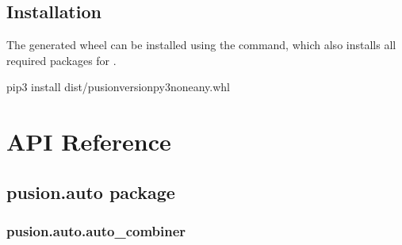 \documentclass[letterpaper,10pt,english]{sphinxmanual}
\begin{document}
\section{Installation}
\label{\detokenize{install:installation}}
\sphinxAtStartPar
The generated wheel can be installed using the  command, which also installs all required packages for .

\begin{sphinxVerbatim}[commandchars=\\\{\}]
pip3 install dist/pusion\PYGZhy{}\PYGZlt{}version\PYGZgt{}\PYGZhy{}py3\PYGZhy{}none\PYGZhy{}any.whl
\end{sphinxVerbatim}


\chapter{API Reference}
\label{\detokenize{pusion:api-reference}}\label{\detokenize{pusion::doc}}

\section{pusion.auto package}
\label{\detokenize{pusion.auto:pusion-auto-package}}\label{\detokenize{pusion.auto::doc}}

\subsection{pusion.auto.auto\_combiner}
\label{\detokenize{pusion.auto.auto_combiner:module-pusion.auto.auto_combiner}}\label{\detokenize{pusion.auto.auto_combiner:pusion-auto-auto-combiner}}\label{\detokenize{pusion.auto.auto_combiner:ac-cref}}\label{\detokenize{pusion.auto.auto_combiner::doc}}
\end{document}
